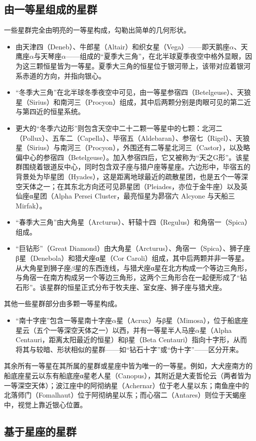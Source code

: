 \subsection{由一等星组成的星群}
一些星群完全由明亮的一等星构成，勾勒出简单的几何形状。
\begin{itemize}
\item 由天津四（Deneb）、牛郎星（Altair）和织女星（Vega）——即天鹅座$\alpha$、天鹰座$\alpha$与天琴座$\alpha$——组成的“夏季大三角”，在北半球夏季夜空中格外显眼，因为这三颗恒星皆为一等星。夏季大三角的恒星位于银河带上，该带对应着银河系赤道的方向，并指向银心。
\item “冬季大三角”在北半球冬季夜空中可见，由一等星参宿四（Betelgeuse）、天狼星（Sirius）和南河三（Procyon）组成，其中后两颗分别是肉眼可见的第二近与第四近的恒星系统。
\item 更大的“冬季六边形”则包含天空中二十二颗一等星中的七颗：北河二（Pollux）、五车二（Capella）、毕宿五（Aldebaran）、参宿七（Rigel）、天狼星（Sirius）与南河三（Procyon），外围还有二等星北河三（Castor），以及略偏中心的参宿四（Betelgeuse）。加入参宿四后，它又被称为“天之G形”。该星群围绕着银道反中心，同时包含双子座与猎户座等星座。六边形中，毕宿五的背景处为毕星团（Hyades），这是距离地球最近的疏散星团，也是五个一等深空天体之一；在其东北方向还可见昴星团（Pleiades，亦位于金牛座）以及英仙座α星团（Alpha Persei Cluster，最亮恒星为昴宿六 Alcyone 与天船三 Mirfak）。
\item “春季大三角”由大角星（Arcturus）、轩辕十四（Regulus）和角宿一（Spica）组成。
\item “巨钻形”（Great Diamond）由大角星（Arcturus）、角宿一（Spica）、狮子座β星（Denebola）和猎犬座α星（Cor Caroli）组成，其中后两颗并非一等星。从大角星到狮子座$\beta$星的东西连线，与猎犬座α星在北方构成一个等边三角形，与角宿一在南方构成另一个等边三角形，这两个三角形合在一起便形成了“钻石形”。该星群的恒星正式分布于牧夫座、室女座、狮子座与猎犬座。
\end{itemize}
其他一些星群部分由多颗一等星构成。
\begin{itemize}
\item “南十字座”包含一等星南十字座$\alpha$星（Acrux）与β星（Mimosa），位于船底座星云（五个一等深空天体之一）以西，并有一等星半人马座$\alpha$星（Alpha Centauri，距离太阳最近的恒星）和β星（Beta Centauri）指向十字形，从而将其与较暗、形状相似的星群——如“钻石十字”或“伪十字”——区分开来。
\end{itemize}
其余所有一等星在其所属的星群或星座中皆为唯一的一等星。例如，大犬座南方的船底座星云以东有船底座α星老人星（Canopus），其附近是大麦哲伦云（两者皆为一等深空天体）；波江座中的阿彻纳星（Achernar）位于老人星以东；南鱼座中的北落师门（Fomalhaut）位于阿彻纳星以东；而心宿二（Antares）则位于天蝎座中，视觉上靠近银心位置。
\subsection{基于星座的星群}